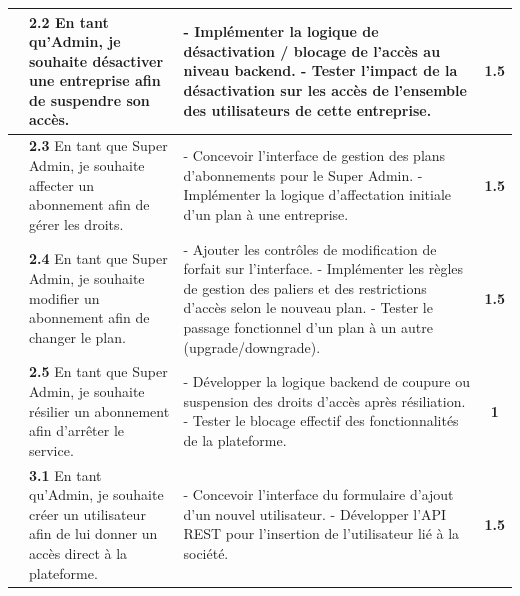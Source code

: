 \begin{small}
\begin{longtable}{|p{2.5cm}|p{6.0cm}|p{6.0cm}|c|}
& \textbf{2.2} En tant qu'Admin, je souhaite désactiver une entreprise afin de 
suspendre son accès.
& - Implémenter la logique de désactivation / blocage de l'accès au niveau backend.\newline
- Tester l'impact de la désactivation sur les accès de l'ensemble des utilisateurs 
de cette entreprise.
& \textbf{1.5} \\ \hline

& \textbf{2.3} En tant que Super Admin, je souhaite affecter un abonnement afin de 
gérer les droits.
& - Concevoir l'interface de gestion des plans d'abonnements pour le Super Admin.\newline
- Implémenter la logique d'affectation initiale d'un plan à une entreprise.
& \textbf{1.5} \\ 

& \textbf{2.4} En tant que Super Admin, je souhaite modifier un abonnement afin de 
changer le plan.
& - Ajouter les contrôles de modification de forfait sur l'interface.\newline
- Implémenter les règles de gestion des paliers et des restrictions d'accès selon 
le nouveau plan.\newline
- Tester le passage fonctionnel d'un plan à un autre (upgrade/downgrade).
& \textbf{1.5} \\ 

& \textbf{2.5} En tant que Super Admin, je souhaite résilier un abonnement afin 
d'arrêter le service.
& - Développer la logique backend de coupure ou suspension des droits d'accès 
après résiliation.\newline
- Tester le blocage effectif des fonctionnalités de la plateforme.
& \textbf{1} \\ \hline

& \textbf{3.1} En tant qu'Admin, je souhaite créer un utilisateur afin de lui donner 
un accès direct à la plateforme.
& - Concevoir l'interface du formulaire d'ajout d'un nouvel utilisateur.\newline
- Développer l'API REST pour l'insertion de l'utilisateur lié à la société.
& \textbf{1.5} \\ 


\end{longtable}
\end{small}
